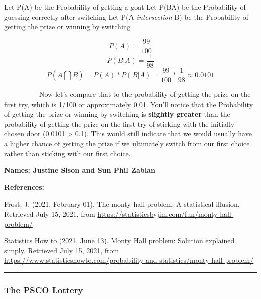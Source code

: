 \documentclass[
]{article}
\begin{document}
Let P(A) be the Probability of getting a goat Let P(B\textbar A) be the
Probability of guessing correctly after switching Let P(A
\emph{intersection} B) be the Probability of getting the prize or
winning by switching

\[ P(A)= \frac{99}{100} \] \[ P(B|A) = \frac{1}{98}\]
\[ P(A \bigcap B) = P(A)*P(B|A) = \frac{99}{100} * \frac{1}{98} \approx 0.0101 \]

~~~~~~~~~~Now let's compare that to the probability of getting the prize
on the first try, which is 1/100 or approximately 0.01. You'll notice
that the Probability of getting the prize or winning by switching is
\textbf{slightly greater} than the probability of getting the prize on
the first try of sticking with the initially chosen door (0.0101
\textgreater{} 0.1). This would still indicate that we would usually
have a higher chance of getting the prize if we ultimately switch from
our first choice rather than sticking with our first choice.

\textbf{Names: Justine Sison and Sun Phil Zablan}

\textbf{References:}

Frost, J. (2021, February 01). The monty hall problem: A statistical
illusion. Retrieved July 15, 2021, from
\url{https://statisticsbyjim.com/fun/monty-hall-problem/}

Statistics How to (2021, June 13). Monty Hall problem: Solution
explained simply. Retrieved July 15, 2021, from
\url{https://www.statisticshowto.com/probability-and-statistics/monty-hall-problem/}

\begin{center}\rule{0.5\linewidth}{0.5pt}\end{center}

\hypertarget{the-psco-lottery}{%
\subsubsection{\texorpdfstring{\textbf{The PSCO
Lottery}}{The PSCO Lottery}}\label{the-psco-lottery}}
\end{document}
